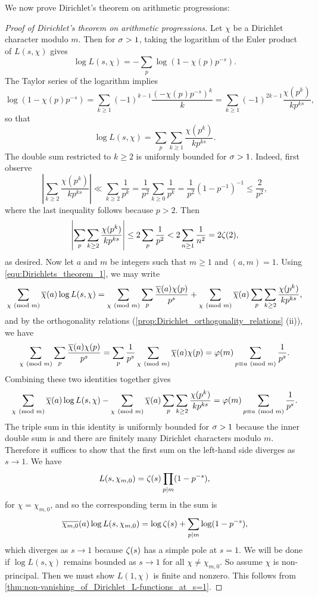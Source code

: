     We now prove Dirichlet's theorem on arithmetic progressions:

    \begin{proof}[Proof of Dirichlet's theorem on arithmetic progressions]
        Let $\chi$ be a Dirichlet character modulo $m$. Then for $\sigma > 1$, taking the logarithm of the Euler product of $L(s,\chi)$ gives
        \[
          \log{L(s,\chi)} = -\sum_{p}\log(1-\chi(p)p^{-s}).
        \]
        The Taylor series of the logarithm implies
        \[
          \log(1-\chi(p)p^{-s}) = \sum_{k \ge 1}(-1)^{k-1}\frac{(-\chi(p)p^{-s})^{k}}{k} = \sum_{k \ge 1}(-1)^{2k-1}\frac{\chi(p^{k})}{kp^{ks}},
        \]
        so that
        \begin{equation}\label{equ:Dirichlets_theorem_1}
          \log{L(s,\chi)} = \sum_{p}\sum_{k \ge 1}\frac{\chi(p^{k})}{kp^{ks}}.
        \end{equation}
        The double sum restricted to $k \ge 2$ is uniformly bounded for $\sigma > 1$. Indeed, first observe
        \[
          \left|\sum_{k \ge 2}\frac{\chi(p^{k})}{kp^{ks}}\right| \ll \sum_{k \ge 2}\frac{1}{p^{k}} = \frac{1}{p^{2}}\sum_{k \ge 0}\frac{1}{p^{k}} = \frac{1}{p^{2}}(1-p^{-1})^{-1} \le \frac{2}{p^{2}},
        \]
        where the last inequality follows because $p > 2$. Then
        \[
          \left|\sum_{p}\sum_{k \ge 2}\frac{\chi(p^{k})}{kp^{ks}}\right| \le 2\sum_{p}\frac{1}{p^{2}} < 2\sum_{n \ge 1}\frac{1}{n^{2}} = 2\zeta(2),
        \]
        as desired. Now let $a$ and $m$ be integers such that $m \ge 1$ and $(a,m) = 1$. Using \cref{equ:Dirichlets_theorem_1}, we may write
        \[
          \sum_{\chi \ \left(\text{mod }m\right)}\overline{\chi}(a)\log{L(s,\chi)} = \sum_{\chi \ \left(\text{mod }m\right)}\sum_{p}\frac{\overline{\chi}(a)\chi(p)}{p^{s}}+\sum_{\chi \ \left(\text{mod }m\right)}\overline{\chi}(a)\sum_{p}\sum_{k \ge 2}\frac{\chi(p^{k})}{kp^{ks}},
        \]
        and by the orthogonality relations (\cref{prop:Dirichlet_orthogonality_relations} (ii)), we have
        \[
          \sum_{\chi \ \left(\text{mod }m\right)}\sum_{p}\frac{\overline{\chi}(a)\chi(p)}{p^{s}} = \sum_{p}\frac1{p^{s}}\sum_{\chi \ \left(\text{mod }m\right)}\overline{\chi}(a)\chi(p) = \varphi(m)\sum_{p \equiv{a} \ \left(\text{mod }m\right)}\frac{1}{p^{s}}.
        \]
        Combining these two identities together gives
        \[
          \sum_{\chi \ \left(\text{mod }m\right)}\overline{\chi}(a)\log{L(s,\chi)}-\sum_{\chi \ \left(\text{mod }m\right)}\overline{\chi}(a)\sum_{p}\sum_{k \ge 2}\frac{\chi(p^{k})}{kp^{ks}} = \varphi(m)\sum_{p \equiv{a} \ \left(\text{mod }m\right)}\frac{1}{p^{s}}.
        \]
        The triple sum in this identity is uniformly bounded for $\sigma > 1$ because the inner double sum is and there are finitely many Dirichlet characters modulo $m$. Therefore it suffices to show that the first sum on the left-hand side diverges as $s \to 1$. We have
        \[
          L(s,\chi_{m,0}) = \zeta(s)\prod_{p \mid m}(1-p^{-s}),
        \]
        for $\chi = \chi_{m,0}$, and so the corresponding term in the sum is
        \[
          \overline{\chi_{m,0}}(a)\log L(s,\chi_{m,0}) = \log\zeta(s)+\sum_{p \mid m}\log(1-p^{-s}),
        \]
        which diverges as $s \to 1$ because $\zeta(s)$ has a simple pole at $s = 1$. We will be done if $\log{L(s,\chi)}$ remains bounded as $s \to 1$ for all $\chi \neq \chi_{m,0}$. So assume $\chi$ is non-principal. Then we must show $L(1,\chi)$ is finite and nonzero. This follows from \cref{thm:non-vanishing_of_Dirichlet_L-functions_at_s=1}.
    \end{proof}
